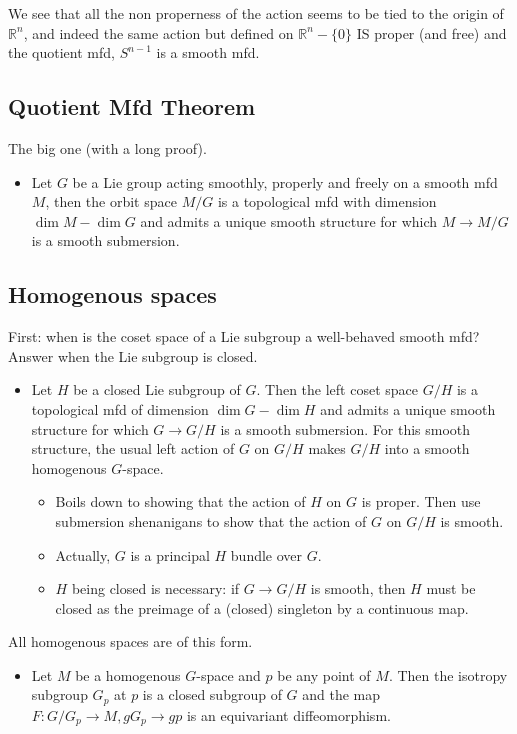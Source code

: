 \documentclass{report}
\theoremstyle{definition}
\begin{document}
\begin{itemize}
    We see that all the non properness of the action seems to be tied to the origin of $\mathbb{R}^n$, and indeed the same action but defined on $\mathbb{R}^n-\{0\}$ IS proper (and free) and the quotient mfd, $S^{n-1}$ is a smooth mfd.
\end{itemize}

\subsection{Quotient Mfd Theorem}

The big one (with a long proof).
\begin{itemize}
    \item Let $G$ be a Lie group acting smoothly, properly and freely on a smooth mfd $M$, then the orbit space $M/G$ is a topological mfd with dimension $\dim M-\dim G$ and admits a unique smooth structure for which $M\to M/G$ is a smooth submersion.
\end{itemize}

\subsection{Homogenous spaces}

First: when is the coset space of a Lie subgroup a well-behaved smooth mfd? Answer when the Lie subgroup is closed.
\begin{itemize}
    \item Let $H$ be a closed Lie subgroup of $G$. Then the left coset space $G/H$ is a topological mfd of dimension $\dim G-\dim H$ and admits a unique smooth structure for which $G\to G/H$ is a smooth submersion. For this smooth structure, the usual left action of $G$ on $G/H$ makes $G/H$ into a smooth homogenous $G$-space.

    \begin{itemize}
        \item Boils down to showing that the action of $H$ on $G$ is proper. Then use submersion shenanigans to show that the action of $G$ on $G/H$ is smooth.
        \item Actually, $G$ is a principal $H$ bundle over $G$.
        \item $H$ being closed is necessary: if $G\to G/H$ is smooth, then $H$ must be closed as the preimage of a (closed) singleton by a continuous map.
    \end{itemize}
\end{itemize}

All homogenous spaces are of this form.
\begin{itemize}
    \item Let $M$ be a homogenous $G$-space and $p$ be any point of $M$. Then the isotropy subgroup $G_p$ at $p$ is a closed subgroup of $G$ and the map $F:G/G_p\to M, gG_p\to gp$ is an equivariant diffeomorphism. 
\end{itemize}
\end{document}

